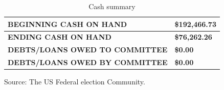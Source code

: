\documentclass[
	a4paper, %
	12pt,%
]{CSSullivanBusinessReport}
\begin{document}
\begin{fullwidth}
\begin{appendices}
\begin{table}[!ht]
    \label{totalspent}
\end{table}
\begin{table}[!ht]\footnotesize
    \centering
    \caption{Cash summary}
    \begin{tabular}{l|l}
    \hline
        \textbf{BEGINNING CASH ON HAND} & \textbf{\$192,466.73  } \\ \hline
        \textbf{ENDING CASH ON HAND} & \textbf{\$76,262.26}   \\ \hline
        \textbf{DEBTS/LOANS OWED TO COMMITTEE} & \textbf{\$0.00}   \\ \hline
        \textbf{DEBTS/LOANS OWED BY COMMITTEE} & \textbf{\$0.00}   \\ \hline
    \end{tabular}
    \label{cashsum}
    Source: The US Federal election Community.
\end{table}
\end{appendices}
\end{fullwidth}
\end{document}
